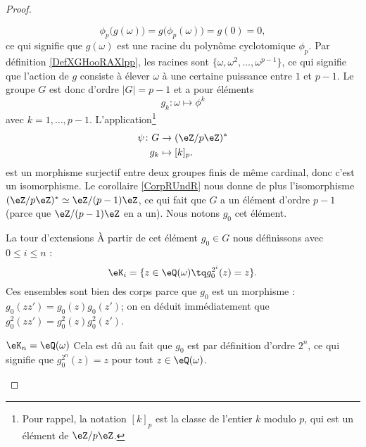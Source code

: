 \begin{proof}
\begin{subproof}
\begin{subproof}
                    \begin{equation}
                        \phi_p\big( g(\omega) \big)=g\big( \phi_p(\omega) \big)=g(0)=0,
                    \end{equation}
                    ce qui signifie que \( g(\omega)\) est une racine du polynôme cyclotomique \( \phi_p\). Par définition \ref{DefXGHooRAXlpp}, les racines sont \( \{ \omega,\omega^2,\ldots, \omega^{p-1} \}\), ce qui signifie que l'action de \( g\) consiste à élever \( \omega\) à une certaine puissance entre \( 1\) et \( p-1\). Le groupe \( G\) est donc d'ordre \( | G |=p-1\) et a pour éléments
                    \begin{equation}
                        g_k\colon \omega\mapsto \phi^k
                    \end{equation}
                    avec \( k=1,\ldots, p-1\). L'application\footnote{Pour rappel, la notation \( [k]_p\) est la classe de l'entier \( k\) modulo \( p\), qui est un élément de \( \eZ/p\eZ\).}
                    \begin{equation}
                        \begin{aligned}
                            \psi\colon G&\to (\eZ/p\eZ)^* \\
                            g_k&\mapsto [k]_p .
                        \end{aligned}
                    \end{equation}
                    est un morphisme surjectif entre deux groupes finis de même cardinal, donc c'est un isomorphisme. Le corollaire \ref{CorpRUndR} nous donne de plus l'isomorphisme \( (\eZ/p\eZ)^*\simeq \eZ/(p-1)\eZ\), ce qui fait que \( G\) a un élément d'ordre \( p-1\) (parce que \( \eZ/(p-1)\eZ\) en a un). Nous notons \( g_0\) cet élément.
                \item[La tour d'extensions]
                    À partir de cet élément \( g_0\in G\) nous définissons avec \( 0\leq i\leq n\) :
                    \begin{equation}
                        \eK_i=\{ z\in \eQ(\omega)\tq g_0^{2^i}(z)=z \}.
                    \end{equation}
                    Ces ensembles sont bien des corps parce que \( g_0\) est un morphisme : \( g_0(zz')=g_0(z)g_0(z')\); on en déduit immédiatement que \( g_0^2(zz')=g_0^2(z)g_0^2(z')\).
                \item[\( \eK_n=\eQ(\omega)\)]
                    Cela est dû au fait que \( g_0\) est par définition d'ordre \( 2^n\), ce qui signifie que \( g_0^{2^n}(z)=z\) pour tout \( z\in \eQ(\omega)\).

\end{subproof}
\end{subproof}
\end{proof}
